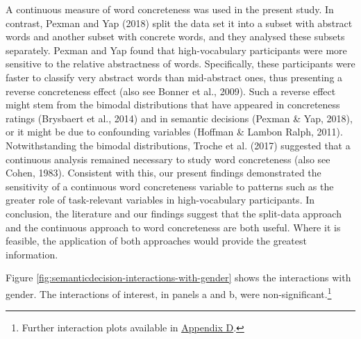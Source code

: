 \documentclass[
  12pt,
  man,floatsintext]{apa7}
\begin{document}
A continuous measure of word concreteness was used in the present study. In contrast, Pexman and Yap (2018) split the data set it into a subset with abstract words and another subset with concrete words, and they analysed these subsets separately. Pexman and Yap found that high-vocabulary participants were more sensitive to the relative abstractness of words. Specifically, these participants were faster to classify very abstract words than mid-abstract ones, thus presenting a reverse concreteness effect (also see Bonner et al., 2009). Such a reverse effect might stem from the bimodal distributions that have appeared in concreteness ratings (Brysbaert et al., 2014) and in semantic decisions (Pexman \& Yap, 2018), or it might be due to confounding variables (Hoffman \& Lambon Ralph, 2011). Notwithstanding the bimodal distributions, Troche et al. (2017) suggested that a continuous analysis remained necessary to study word concreteness (also see Cohen, 1983). Consistent with this, our present findings demonstrated the sensitivity of a continuous word concreteness variable to patterns such as the greater role of task-relevant variables in high-vocabulary participants. In conclusion, the literature and our findings suggest that the split-data approach and the continuous approach to word concreteness are both useful. Where it is feasible, the application of both approaches would provide the greatest information.

Figure \ref{fig:semanticdecision-interactions-with-gender} shows the interactions with gender. The interactions of interest, in panels a and b, were non-significant.\footnote{Further interaction plots available in \protect\hyperlink{appendix-D-interaction-plots}{\underline{Appendix D}}.}
\end{document}
